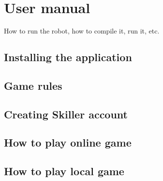 \section{User manual}

How to run the robot, how to compile it, run it, etc.

\subsection{Installing the application}

\subsection{Game rules}

\subsection{Creating Skiller account}

\subsection{How to play online game}

\subsection{How to play local game}




